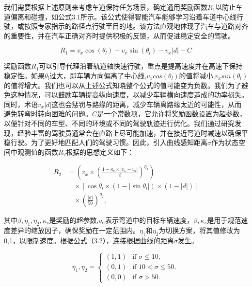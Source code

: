 我们需要根据上述原则来考虑车道保持任务场景，确定通用奖励函数$𝑅_1$以防止车道偏离和碰撞，如公式3.1所示。该公式使得智能汽车能够学习沿着车道中心线行驶，或按照专家指示的路径点行驶至目的地。该方法直观地体现了汽车与道路对齐的重要性，并在汽车正确对齐时提供积极的反馈，从而促进稳定安全的驾驶。

\begin{equation}
	R_1 = v_x \cos(\theta_l) - v_x \sin(\theta_l) - v_x \lvert d \rvert - C
\end{equation}

奖励函数$𝑅_1$可以引导代理沿着轨道轴快速行驶，重点是提高速度并在高速下保持稳定性。如果$𝜃_𝑙$过大，即车辆方向偏离了中心线,$𝑣_𝑥 cos(𝜃_𝑙)$的值将减小,$𝑣_𝑥 sin(𝜃_𝑙)$的值将增大。我们也可以从上述公式知晓整个公式的值可能变为负数。我们为了避免这种情况，可以鼓励车辆提高纵向速度，以减少车辆横向速度造成的功率损失。同时，术语$𝑣_𝑥|𝑑|$这也会惩罚与路缘的距离，减少车辆离路缘太近的可能性，从而避免转弯时转向困难的问题。$𝐶$是一个常数项，它允许将奖励函数设置为超参数，以便针对不同的车型、不同的环境或不同的驾驶轨迹进行优化。我们通过研究发现，经验丰富的驾驶员通常会在直路上尽可能加速，并在接近弯道时减速以确保平稳行驶。为了更好地匹配人们的驾驶习惯。因此，引入曲线感知距离$𝜎$作为状态空间中观测值的函数$𝑅_2$根据\cite{zou2021deep}的思想定义如下：

\begin{equation}
	\begin{split}
		R_2 &= \left( v_x \times \left( \frac{1 - \kappa_v \times \lvert v_x - v_a \rvert}{\beta} \right)^{\eta_1} \right) \\
		&\quad \times \left[ \cos \theta_l \times (1 - \lvert \sin \theta_l \rvert) \times (1 - \lvert d \rvert) \right] \\
		&\quad \times \left( \frac{\lvert \sigma \rvert}{50} \right)^{\eta_2},
	\end{split}
\end{equation}

其中$𝛽,𝜂_1,𝜂_2,𝜅_𝑣$是奖励的超参数,$𝑣_𝛼$表示弯道中的目标车辆速度，$𝛽,𝜅_𝑣$是用于规范速度差异的缩放因子，确保奖励在一定范围内。$𝜂_1$和$𝜂_2$为切换方案，将其值修改为{0,1}，以限制速度。根据公式（3.2），连接根据曲线的距离$𝜎$发生。

\begin{equation}
	\eta_1, \eta_2 = 
	\begin{cases} 
		(1, 1) & \text{if } \sigma \leq 10, \\ 
		(0, 1) & \text{if } 10 < \sigma \leq 50, \\ 
		(0, 0) & \text{if } \sigma > 50. 
	\end{cases}
\end{equation}

